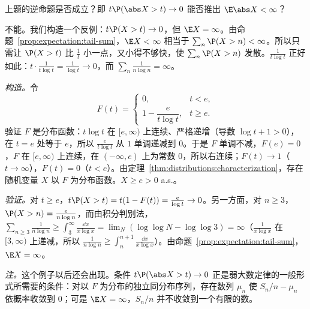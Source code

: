\begin{workedexample}\label{we:expectation:tP-converse}
上题的逆命题是否成立？即 $t\P(\abs X>t)\to0$ 能否推出 $\E\abs X<\infty$？
\end{workedexample}
\begin{solution}
不能。我们构造一个反例：$t\P(X>t)\to0$，但 $\E X=\infty$。由命题~\ref{prop:expectation:tail-sum}，$\E X<\infty$ 相当于 $\sum_n\P(X>n)<\infty$。所以只需让 $\P(X>t)$ 比 $\frac1t$ 小一点，又小得不够快，使 $\sum_n\P(X>n)$ 发散。$\frac1{t\log t}$ 正好如此：$t\cdot\frac1{t\log t}=\frac1{\log t}\to0$，而 $\sum_n\frac1{n\log n}=\infty$。

\emph{构造。}令
\[
F(t)=\begin{cases}0,&t<e,\\ 1-\dfrac e{t\log t},&t\geqslant e.\end{cases}
\]
验证 $F$ 是分布函数：$t\log t$ 在 $[e,\infty)$ 上连续、严格递增（导数 $\log t+1>0$），在 $t=e$ 处等于 $e$，所以 $\frac e{t\log t}$ 从 $1$ 单调递减到 $0$。于是 $F$ 单调不减，$F(e)=0$，$F$ 在 $[e,\infty)$ 上连续，在 $(-\infty,e)$ 上为常数 $0$，所以右连续；$F(t)\to1$（$t\to\infty$），$F(t)=0$（$t<e$）。由定理~\ref{thm:distributions:characterization}，存在随机变量 $X$ 以 $F$ 为分布函数。$X\geqslant e>0$ a.s.。

\emph{验证。}对 $t\geqslant e$，$t\P(X>t)=t(1-F(t))=\frac e{\log t}\to0$。另一方面，对 $n\geqslant3$，$\P(X>n)=\frac e{n\log n}$，而由积分判别法，$\sum_{n\geqslant3}\frac1{n\log n}\geqslant\int_3^\infty\frac{\dd x}{x\log x}=\lim_N(\log\log N-\log\log3)=\infty$（$\frac1{x\log x}$ 在 $[3,\infty)$ 上递减，所以 $\frac1{n\log n}\geqslant\int_n^{n+1}\frac{\dd x}{x\log x}$）。由命题~\ref{prop:expectation:tail-sum}，$\E X=\infty$。

\emph{注。}这个例子以后还会出现。条件 $t\P(\abs X>t)\to0$ 正是弱大数定律的一般形式所需要的条件：对以 $F$ 为分布的独立同分布序列，存在数列 $\mu_n$ 使 $S_n/n-\mu_n$ 依概率收敛到 $0$；可是 $\E X=\infty$，$S_n/n$ 并不收敛到一个有限的数。
\end{solution}

